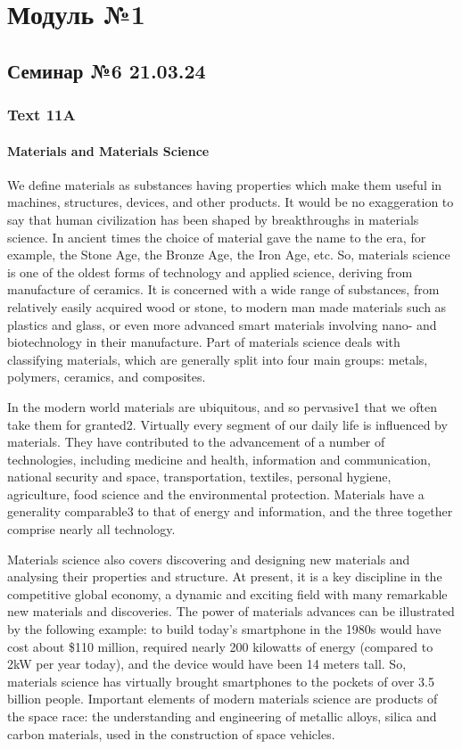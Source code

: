 \part{Модуль №1}

\chapter{Семинар №6 21.03.24}

\section{Text 11A}

\subsection*{Materials and Materials Science}
We define materials as substances having properties which make them useful in machines,
structures, devices, and other products. It would be no exaggeration to say that human civilization
has been shaped by breakthroughs in materials science. In ancient times the choice of material gave
the name to the era, for example, the Stone Age, the Bronze Age, the Iron Age, etc. So, materials
science is one of the oldest forms of technology and applied science, deriving from manufacture of
ceramics. It is concerned with a wide range of substances, from relatively easily acquired wood or
stone, to modern man made materials such as plastics and glass, or even more advanced smart
materials involving nano- and biotechnology in their manufacture. Part of materials science deals
with classifying materials, which are generally split into four main groups: metals, polymers,
ceramics, and composites.

 In the modern world materials are ubiquitous, and so pervasive1 that we often take them for
granted2. Virtually every segment of our daily life is influenced by materials. They have contributed
to the advancement of a number of technologies, including medicine and health, information and
communication, national security and space, transportation, textiles, personal hygiene, agriculture,
food science and the environmental protection. Materials have a generality comparable3 to that of
energy and information, and the three together comprise nearly all technology.

 Materials science also covers discovering and designing new materials and analysing their
properties and structure. At present, it is a key discipline in the competitive global economy, a
dynamic and exciting field with many remarkable new materials and discoveries. The power of
materials advances can be illustrated by the following example: to build today’s smartphone in the
1980s would have cost about \$110 million, required nearly 200 kilowatts of energy (compared to
2kW per year today), and the device would have been 14 meters tall. So, materials science has
virtually brought smartphones to the pockets of over 3.5 billion people. Important elements of
modern materials science are products of the space race: the understanding and engineering of
metallic alloys, silica and carbon materials, used in the construction of space vehicles.

